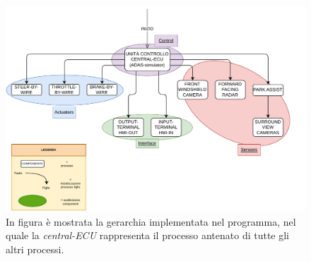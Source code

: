\documentclass[11pt, openany]{article}
\theoremstyle{definition}
\theoremstyle{plain}
\theoremstyle{remark}
\begin{document}
				\begin{figure}[b!]
					\includegraphics[scale=0.8, center]{./include/SO_Progetto_Diagrammi-Gerarchia.pdf}
					\caption{In figura è mostrata la gerarchia implementata nel programma, nel quale la \textit{central-ECU} rappresenta il processo antenato di tutte gli altri processi.}
					\label{fig:gerarchia}
				\end{figure}
\end{document}
